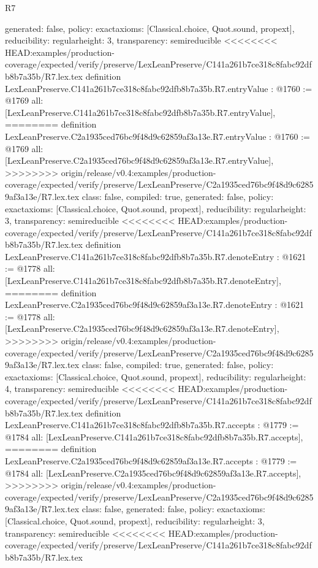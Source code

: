 \begin{lexlean}{R7}
\begin{coremodule}
{{{{{{{{{{{{{{{  generated: false,
  policy: exact{axioms: [Classical.choice, Quot.sound, propext]},
  reducibility: regular{height: 3},
  transparency: semireducible
}
<<<<<<<< HEAD:examples/production-coverage/expected/verify/preserve/LexLeanPreserve/C141a261b7ce318c8fabc92dfb8b7a35b/R7.lex.tex
definition LexLeanPreserve.C141a261b7ce318c8fabc92dfb8b7a35b.R7.entryValue : @1760 := @1769 {
  all: [LexLeanPreserve.C141a261b7ce318c8fabc92dfb8b7a35b.R7.entryValue],
========
definition LexLeanPreserve.C2a1935ced76bc9f48d9c62859af3a13e.R7.entryValue : @1760 := @1769 {
  all: [LexLeanPreserve.C2a1935ced76bc9f48d9c62859af3a13e.R7.entryValue],
>>>>>>>> origin/release/v0.4:examples/production-coverage/expected/verify/preserve/LexLeanPreserve/C2a1935ced76bc9f48d9c62859af3a13e/R7.lex.tex
  class: false,
  compiled: true,
  generated: false,
  policy: exact{axioms: [Classical.choice, Quot.sound, propext]},
  reducibility: regular{height: 3},
  transparency: semireducible
}
<<<<<<<< HEAD:examples/production-coverage/expected/verify/preserve/LexLeanPreserve/C141a261b7ce318c8fabc92dfb8b7a35b/R7.lex.tex
definition LexLeanPreserve.C141a261b7ce318c8fabc92dfb8b7a35b.R7.denoteEntry : @1621 := @1778 {
  all: [LexLeanPreserve.C141a261b7ce318c8fabc92dfb8b7a35b.R7.denoteEntry],
========
definition LexLeanPreserve.C2a1935ced76bc9f48d9c62859af3a13e.R7.denoteEntry : @1621 := @1778 {
  all: [LexLeanPreserve.C2a1935ced76bc9f48d9c62859af3a13e.R7.denoteEntry],
>>>>>>>> origin/release/v0.4:examples/production-coverage/expected/verify/preserve/LexLeanPreserve/C2a1935ced76bc9f48d9c62859af3a13e/R7.lex.tex
  class: false,
  compiled: true,
  generated: false,
  policy: exact{axioms: [Classical.choice, Quot.sound, propext]},
  reducibility: regular{height: 4},
  transparency: semireducible
}
<<<<<<<< HEAD:examples/production-coverage/expected/verify/preserve/LexLeanPreserve/C141a261b7ce318c8fabc92dfb8b7a35b/R7.lex.tex
definition LexLeanPreserve.C141a261b7ce318c8fabc92dfb8b7a35b.R7.accepts : @1779 := @1784 {
  all: [LexLeanPreserve.C141a261b7ce318c8fabc92dfb8b7a35b.R7.accepts],
========
definition LexLeanPreserve.C2a1935ced76bc9f48d9c62859af3a13e.R7.accepts : @1779 := @1784 {
  all: [LexLeanPreserve.C2a1935ced76bc9f48d9c62859af3a13e.R7.accepts],
>>>>>>>> origin/release/v0.4:examples/production-coverage/expected/verify/preserve/LexLeanPreserve/C2a1935ced76bc9f48d9c62859af3a13e/R7.lex.tex
  class: false,
  generated: false,
  policy: exact{axioms: [Classical.choice, Quot.sound, propext]},
  reducibility: regular{height: 3},
  transparency: semireducible
}
<<<<<<<< HEAD:examples/production-coverage/expected/verify/preserve/LexLeanPreserve/C141a261b7ce318c8fabc92dfb8b7a35b/R7.lex.tex
}}}}}}}}}}}}}}}}}
\end{coremodule}
\end{lexlean}
